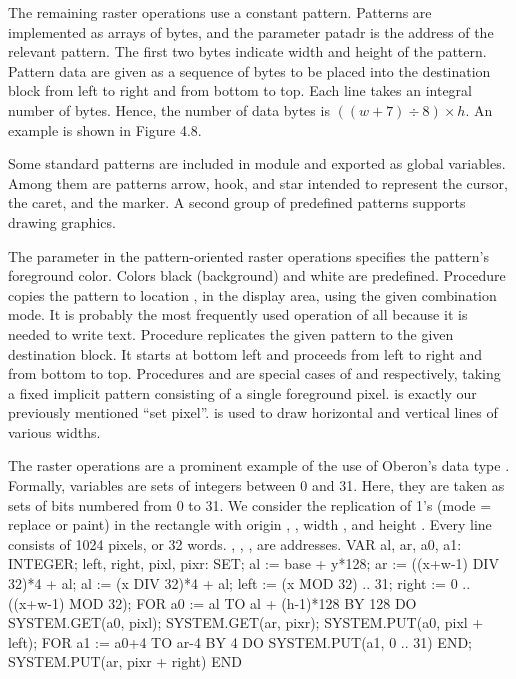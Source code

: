 The remaining raster operations use a constant pattern. Patterns are
implemented as arrays of bytes, and the parameter patadr is the
address of the relevant pattern. The first two bytes indicate width 
and height  of the pattern. Pattern data are given as a sequence of
bytes to be placed into the destination block from left to right and
from bottom to top. Each line takes an integral number of
bytes. Hence, the number of data bytes is $((w+7) \div 8) \times h$. An
example is shown in Figure 4.8.


Some standard patterns are included in module  and exported as
global variables. Among them are patterns arrow, hook, and star
intended to represent the cursor, the caret, and the marker. A second
group of predefined patterns supports drawing graphics.

The parameter  in the pattern-oriented raster operations specifies the pattern's foreground color. Colors black (background) and white are predefined. Procedure  copies the pattern to location ,  in the display area, using the given combination mode. It is probably the most frequently used operation of all because it is needed to write text. Procedure  replicates the given pattern to the given destination block. It starts at bottom left and proceeds from left to right and from bottom to top. Procedures  and  are special cases of  and  respectively, taking a fixed implicit pattern consisting of a single foreground pixel.  is exactly our previously mentioned ``set pixel''.  is used to draw horizontal and vertical lines of various widths.

The raster operations are a prominent example of the use of Oberon's data type . Formally, variables are sets of integers between 0 and 31. Here, they are taken as sets of bits numbered from 0 to 31. We consider the replication of 1's (mode = replace or paint) in the rectangle with origin , , width , and height . Every line consists of 1024 pixels, or 32 words. , , ,  are addresses.
\begintt
VAR al, ar, a0, a1: INTEGER; left, right, pixl, pixr: SET;
al := base + y*128;
ar := ((x+w-1) DIV 32)*4 + al; al := (x DIV 32)*4 + al;
left := {(x MOD 32) .. 31}; right := {0 .. ((x+w-1) MOD 32)};
FOR a0 := al TO al + (h-1)*128 BY 128 DO
  SYSTEM.GET(a0, pixl); SYSTEM.GET(ar, pixr);
  SYSTEM.PUT(a0, pixl + left);
  FOR a1 := a0+4 TO ar-4 BY 4 DO SYSTEM.PUT(a1, {0 .. 31}) END;
  SYSTEM.PUT(ar, pixr + right)
END
\endtt

